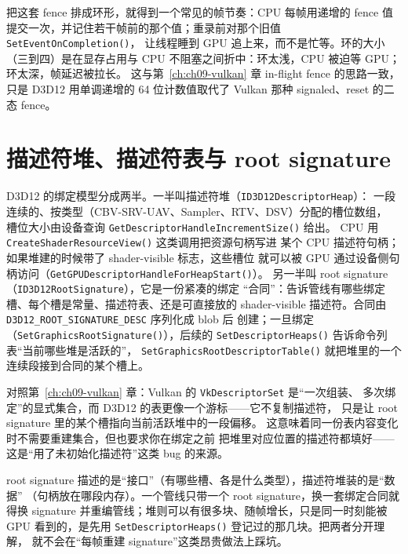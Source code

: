 \documentclass[12pt,a4paper,fontset=fandol]{ctexbook}
\newcommand{\Fn}[1]{\texttt{#1()}}
\newcommand{\Tp}[1]{\texttt{#1}}
\newcommand{\Bk}{\discretionary{}{}{}}
\newcommand{\Lang}[1]{\textsf{#1}}
\newcommand{\DomCPU}{\Lang{CPU}}
\newcommand{\DomGPU}{\Lang{GPU}}
\begin{document}
把这套 fence 排成环形，就得到一个常见的帧节奏：\DomCPU{} 每帧用递增的 fence 值
提交一次，并记住若干帧前的那个值；重录前对那个旧值 \Fn{Set\Bk Event\Bk On\Bk Completion}，
让线程睡到 \DomGPU{} 追上来，而不是忙等。环的大小（三到四）是在显存占用与
\DomCPU{} 不阻塞之间折中：环太浅，\DomCPU{} 被迫等 \DomGPU{}；环太深，帧延迟被拉长。
这与第~\ref{ch:ch09-vulkan} 章 in-flight fence 的思路一致，只是 D3D12 用单调递增的
64 位计数值取代了 Vulkan 那种 signaled、reset 的二态 fence。

\section{描述符堆、描述符表与 root signature}

D3D12 的绑定模型分成两半。一半叫描述符堆（\Tp{ID3D12\Bk Descriptor\Bk Heap}）：
一段连续的、按类型（CBV-SRV-UAV、Sampler、RTV、DSV）分配的槽位数组，
槽位大小由设备查询 \Fn{Get\Bk Descriptor\Bk Handle\Bk Increment\Bk Size} 给出。
\DomCPU{} 用 \Fn{Create\Bk Shader\Bk Resource\Bk View} 这类调用把资源句柄写进
某个 \DomCPU{} 描述符句柄；如果堆建的时候带了 shader-visible 标志，这些槽位
就可以被 \DomGPU{} 通过设备侧句柄访问（\Fn{Get\Bk GPU\Bk Descriptor\Bk Handle\Bk For\Bk Heap\Bk Start}）。
另一半叫 root signature（\Tp{ID3D12\Bk Root\Bk Signature}），它是一份紧凑的绑定
``合同''：告诉管线有哪些绑定槽、每个槽是常量、描述符表、还是可直接放的
shader-visible 描述符。合同由 \Tp{D3D12\_ROOT\_SIGNATURE\_DESC} 序列化成 blob 后
创建；一旦绑定（\Fn{Set\Bk Graphics\Bk Root\Bk Signature}），后续的
\Fn{Set\Bk Descriptor\Bk Heaps} 告诉命令列表``当前哪些堆是活跃的''，
\Fn{Set\Bk Graphics\Bk Root\Bk Descriptor\Bk Table} 就把堆里的一个连续段接到合同的某个槽上。

对照第~\ref{ch:ch09-vulkan} 章：Vulkan 的 \Tp{Vk\Bk Descriptor\Bk Set} 是``一次组装、
多次绑定''的显式集合，而 D3D12 的表更像一个游标——它不复制描述符，
只是让 root signature 里的某个槽指向当前活跃堆中的一段偏移。
这意味着同一份表内容变化时不需要重建集合，但也要求你在绑定之前
把堆里对应位置的描述符都填好——这是``用了未初始化描述符''这类 bug 的来源。

\begin{note}[title={root signature 与描述符堆的分工}]
root signature 描述的是``接口''（有哪些槽、各是什么类型），描述符堆装的是``数据''
（句柄放在哪段内存）。一个管线只带一个 root signature，换一套绑定合同就得换
signature 并重编管线；堆则可以有很多块、随帧增长，只是同一时刻能被 \DomGPU{}
看到的，是先用 \Fn{Set\Bk Descriptor\Bk Heaps} 登记过的那几块。把两者分开理解，
就不会在``每帧重建 signature''这类昂贵做法上踩坑。
\end{note}
\end{document}

